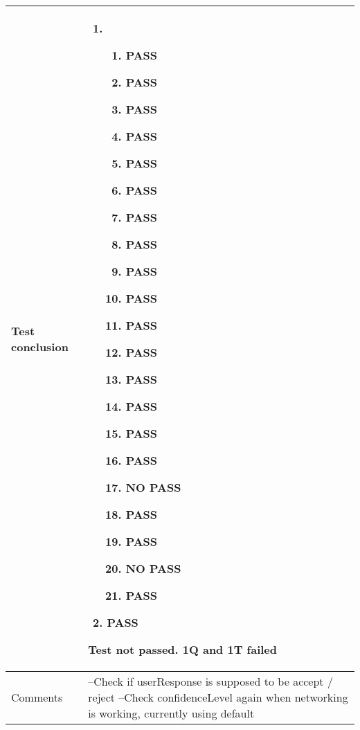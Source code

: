 \documentclass[a4paper]{article}
\begin{document}
\begin{center}
\begin{tabular}{ |  p{3cm} | p{7cm} | }
			Test conclusion & 	\begin{enumerate}
							\item
							\begin{enumerate}
								\item PASS
								\item PASS
								\item PASS
								\item PASS
								\item PASS
								\item PASS								
								\item PASS
								\item PASS
								\item PASS
								\item PASS
								\item PASS								
								\item PASS
								\item PASS
								\item PASS
								\item PASS
								\item PASS
								\item NO PASS
								\item PASS
								\item PASS
								\item NO PASS
								\item PASS
							\end{enumerate}
							\item PASS
						\end{enumerate}
						Test not passed. 1Q and 1T failed \\ [5pt] \hline

			Comments & --Check if userResponse is supposed to be accept / reject 
					--Check confidenceLevel again when networking is working, currently using default
					\\ [5pt] \hline

		\end{tabular}
	\end{center}
\end{document}
